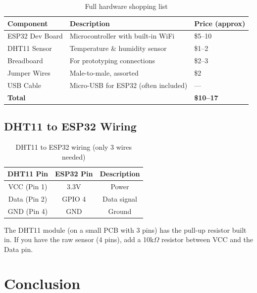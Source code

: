 \documentclass[12pt, a4paper]{report}
\begin{document}
\begin{table}[H]
\centering
\renewcommand{\arraystretch}{1.5}
\begin{tabularx}{\textwidth}{l X l}
\toprule
\textbf{Component} & \textbf{Description} & \textbf{Price (approx)} \\
\midrule
ESP32 Dev Board  & Microcontroller with built-in WiFi & \$5--10 \\
DHT11 Sensor     & Temperature \& humidity sensor & \$1--2 \\
Breadboard       & For prototyping connections & \$2--3 \\
Jumper Wires     & Male-to-male, assorted & \$2 \\
USB Cable        & Micro-USB for ESP32 (often included) & --- \\
\midrule
\textbf{Total}   & & \textbf{\$10--17} \\
\bottomrule
\end{tabularx}
\caption{Full hardware shopping list}
\end{table}

\section{DHT11 to ESP32 Wiring}

\begin{table}[H]
\centering
\renewcommand{\arraystretch}{1.5}
\begin{tabular}{ccc}
\toprule
\textbf{DHT11 Pin} & \textbf{ESP32 Pin} & \textbf{Description} \\
\midrule
VCC (Pin 1) & 3.3V       & Power \\
Data (Pin 2)& GPIO 4     & Data signal \\
GND (Pin 4) & GND        & Ground \\
\bottomrule
\end{tabular}
\caption{DHT11 to ESP32 wiring (only 3 wires needed)}
\end{table}

\begin{tcolorbox}[warnbox, title={Important Note}]
The DHT11 module (on a small PCB with 3 pins) has the pull-up resistor built in. If you have the raw sensor (4 pins), add a 10k$\Omega$ resistor between VCC and the Data pin.
\end{tcolorbox}


\chapter{Conclusion}
\end{document}
